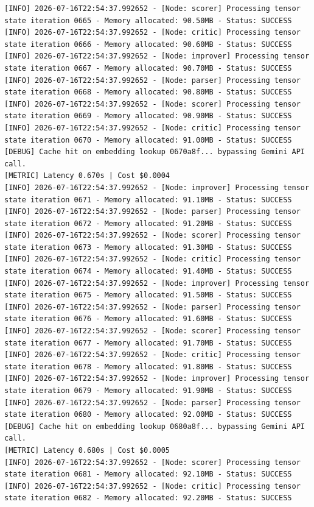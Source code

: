 \documentclass[10pt,journal,compsoc]{IEEEtran}
\begin{document}
\begin{verbatim}
[INFO] 2026-07-16T22:54:37.992652 - [Node: scorer] Processing tensor state iteration 0665 - Memory allocated: 90.50MB - Status: SUCCESS
[INFO] 2026-07-16T22:54:37.992652 - [Node: critic] Processing tensor state iteration 0666 - Memory allocated: 90.60MB - Status: SUCCESS
[INFO] 2026-07-16T22:54:37.992652 - [Node: improver] Processing tensor state iteration 0667 - Memory allocated: 90.70MB - Status: SUCCESS
[INFO] 2026-07-16T22:54:37.992652 - [Node: parser] Processing tensor state iteration 0668 - Memory allocated: 90.80MB - Status: SUCCESS
[INFO] 2026-07-16T22:54:37.992652 - [Node: scorer] Processing tensor state iteration 0669 - Memory allocated: 90.90MB - Status: SUCCESS
[INFO] 2026-07-16T22:54:37.992652 - [Node: critic] Processing tensor state iteration 0670 - Memory allocated: 91.00MB - Status: SUCCESS
[DEBUG] Cache hit on embedding lookup 0670a8f... bypassing Gemini API call.
[METRIC] Latency 0.670s | Cost $0.0004
[INFO] 2026-07-16T22:54:37.992652 - [Node: improver] Processing tensor state iteration 0671 - Memory allocated: 91.10MB - Status: SUCCESS
[INFO] 2026-07-16T22:54:37.992652 - [Node: parser] Processing tensor state iteration 0672 - Memory allocated: 91.20MB - Status: SUCCESS
[INFO] 2026-07-16T22:54:37.992652 - [Node: scorer] Processing tensor state iteration 0673 - Memory allocated: 91.30MB - Status: SUCCESS
[INFO] 2026-07-16T22:54:37.992652 - [Node: critic] Processing tensor state iteration 0674 - Memory allocated: 91.40MB - Status: SUCCESS
[INFO] 2026-07-16T22:54:37.992652 - [Node: improver] Processing tensor state iteration 0675 - Memory allocated: 91.50MB - Status: SUCCESS
[INFO] 2026-07-16T22:54:37.992652 - [Node: parser] Processing tensor state iteration 0676 - Memory allocated: 91.60MB - Status: SUCCESS
[INFO] 2026-07-16T22:54:37.992652 - [Node: scorer] Processing tensor state iteration 0677 - Memory allocated: 91.70MB - Status: SUCCESS
[INFO] 2026-07-16T22:54:37.992652 - [Node: critic] Processing tensor state iteration 0678 - Memory allocated: 91.80MB - Status: SUCCESS
[INFO] 2026-07-16T22:54:37.992652 - [Node: improver] Processing tensor state iteration 0679 - Memory allocated: 91.90MB - Status: SUCCESS
[INFO] 2026-07-16T22:54:37.992652 - [Node: parser] Processing tensor state iteration 0680 - Memory allocated: 92.00MB - Status: SUCCESS
[DEBUG] Cache hit on embedding lookup 0680a8f... bypassing Gemini API call.
[METRIC] Latency 0.680s | Cost $0.0005
[INFO] 2026-07-16T22:54:37.992652 - [Node: scorer] Processing tensor state iteration 0681 - Memory allocated: 92.10MB - Status: SUCCESS
[INFO] 2026-07-16T22:54:37.992652 - [Node: critic] Processing tensor state iteration 0682 - Memory allocated: 92.20MB - Status: SUCCESS

\end{verbatim}
\end{document}
